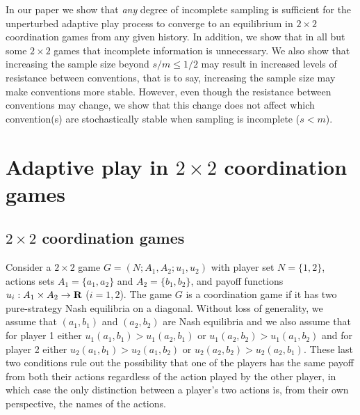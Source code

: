 \documentclass[11.5pt]{article}
\begin{document}
In our paper we show that \textit{any} degree of incomplete sampling is sufficient for the unperturbed adaptive play process to converge to an equilibrium in $2\times 2$ coordination games from any given history. In addition, we show that in all but some $2 \times 2$ games that incomplete information is unnecessary. We also show that increasing the sample size beyond $s/m \leq 1/2$ may result in increased levels of resistance between conventions, that is to say, increasing the sample size may make conventions more stable. However, even though the resistance between conventions may change, we show that this change does not affect which convention(s) are stochastically stable when sampling is incomplete ($s<m$).

\section{Adaptive play in $2\times 2$ coordination games}

\subsection{$2\times 2$ coordination games}

Consider a $2\times 2$ game $G=(N;A_1,A_2;u_1, u_2)$ with player set $N=\{1,2\}$, actions sets $A_1=\{a_1,a_2\}$ and $A_2=\{b_1,b_2\}$, and payoff functions $u_i: A_1\times A_2 \rightarrow \bf{R}$ ($i=1,2$). The game $G$ is a coordination game if it has two pure-strategy Nash equilibria on a diagonal. Without loss of generality, we assume that $(a_1,b_1)$ and $(a_2,b_2)$ are Nash equilibria and we also assume that for player 1 either $u_1(a_1,b_1) > u_1(a_2,b_1)$ or $u_1(a_2,b_2) > u_1(a_1,b_2)$ and for player 2 either $u_2(a_1,b_1) > u_2(a_1,b_2)$ or $u_2(a_2,b_2) > u_2(a_2,b_1)$. These last two conditions rule out the possibility that one of the players has the same payoff from both their actions regardless of the action played by the other player, in which case the only distinction between a player's two actions is, from their own perspective, the names of the actions. %
\end{document}
